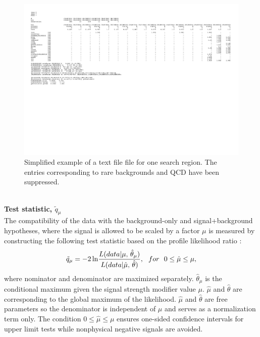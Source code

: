 \begin{figure}
\begin{center}
\includegraphics[width=\textwidth]{Plots/analysis/results/dataCardZeroB.pdf}
\caption{Simplified example of a text file file for one search region. 
The entries corresponding to rare backgrounds and QCD have been suppressed.}\label{fig:datacard}
\end{center}
\end{figure}
\\
\textbf{Test statistic, $\tilde{q}_{\mu}$}\\
The compatibility of the data with the background-only and signal+background
hypotheses, where the signal is allowed to be scaled by a factor $\mu$ is measured by constructing the
following test statistic based on the profile likelihood ratio \cite{CLs3}:
\begin{equation}
{\tilde{q}_\mu} = {-2\,{\rm ln}\frac{L(data|\mu,\, \hat{\theta}_{\mu})}{L(data|\hat{\mu},\, \hat{\theta})}}, \,\,\,\, for \,\,\,\, 0 \leq\hat{\mu}\leq\mu,
\end{equation}
where nominator and denominator are maximized separately. $\hat{\theta}_{\mu}$ is the conditional maximum given the signal strength modifier value $\mu$. $\hat{\mu}$ and $\hat{\theta}$ are corresponding to the global maximum of the likelihood. $\hat{\mu}$ and $\hat{\theta}$ are free parameters so the denominator is independent of $\mu$ and serves as a normalization term only. The condition $0\leq\hat{\mu}\leq\mu$ ensures one-sided confidence intervals for upper limit tests while nonphysical negative signals are avoided.\\
